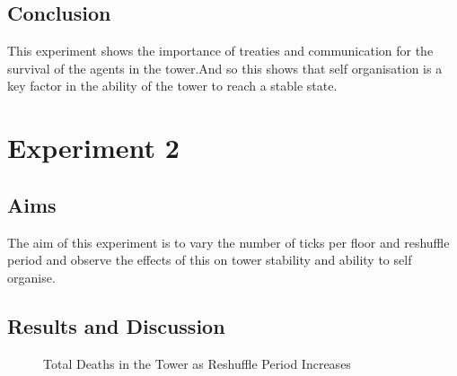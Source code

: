 \subsection{Conclusion}
\label{subsec: E1-Conclusion}
This experiment shows the importance of treaties and communication for the survival of the agents in the tower.And so this shows that self organisation is a key factor in the ability of the tower to reach a stable state.

\section{Experiment 2}
\label{subsec: Experiment 2}
\subsection{Aims}
\label{subsec: E2-Aims}
The aim of this experiment is to vary the number of ticks per floor and reshuffle period and observe the effects of this on tower stability and ability to self organise.
\subsection{Results and Discussion}
\label{subsec: E2-Results and Discussion}

\begin{figure}[H] %
    \centering
    \begin{minipage}{0.8\textwidth}
    \end{minipage}
    \caption{Total Deaths in the Tower as Reshuffle Period Increases}
    \label{fig:Number-of-Deaths-As-Shuffle-Period-Decreases}
\end{figure}

